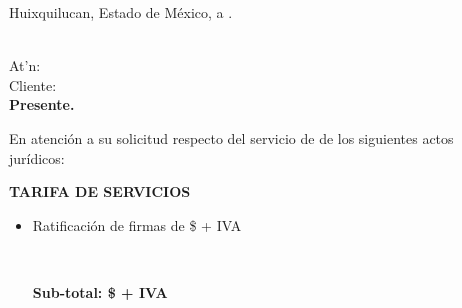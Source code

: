 \begin{flushright}
Huixquilucan, Estado de M\'exico, a \fechaCotizacion.
\end{flushright}
\vspace{1cm}

\begin{flushleft}
\textcolor{principal}{\nombreEmpresa}\\
At'n: \nombreInteresado\\
Cliente: \textcolor{principal}{\cliente}\\[1cm]

\Large\textbf{\textcolor{principal}{Presente.}}\\[1cm]
\end{flushleft}

En atenci\'on a su solicitud respecto del servicio de \textcolor{principal}{\tipoServicio} de los siguientes actos jur\'idicos:

\begin{itemize}
\actosJuridicos
{}

\end{itemize}

\textbf{\textcolor{principal}{TARIFA DE SERVICIOS}}
\begin{itemize}
	\item Ratificaci\'on de firmas de \theactos{}  \$\numprint[MXN]{\totalFirmas}{} + IVA\\
	
	\\
	\begin{flushright}
		\textbf{\textcolor{principal}{Sub-total: \$\numprint[MXN]{\subtotal} + IVA}}
	\end{flushright}

\end{itemize}

